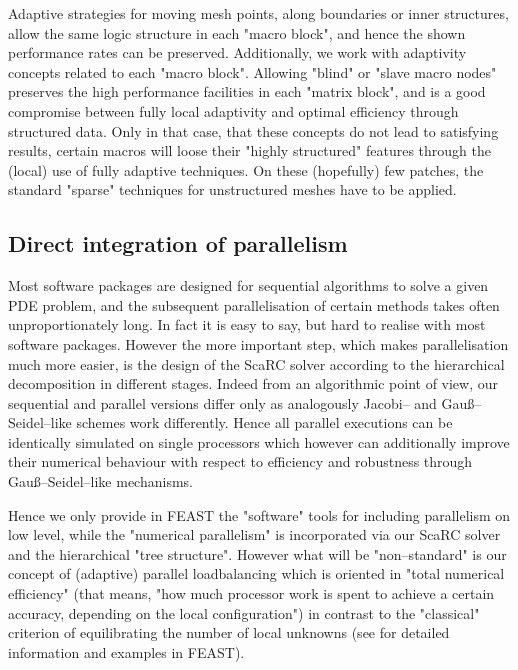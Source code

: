 Adaptive strategies for moving mesh points, along boundaries or inner structures, allow the same 
logic structure in each "macro block", and hence the shown performance rates can be preserved. 
Additionally, we work with adaptivity concepts related to 
each "macro block". Allowing "blind" or "slave macro nodes" preserves the 
high performance facilities in each "matrix block", and is a good compromise between fully local 
adaptivity and optimal efficiency through structured data. Only in that case, that these concepts do not 
lead to satisfying results, certain macros will loose their "highly structured" features through 
the (local) use of fully adaptive techniques. On these (hopefully) few patches, the standard "sparse" 
techniques for unstructured meshes have to be applied.

\subsection{Direct integration of parallelism}

Most software packages are designed for sequential algorithms to solve a given PDE problem, and the 
subsequent parallelisation of certain methods takes often unproportionately long. 
In fact it is easy to say, but hard to realise with most software packages.  However the more important step, which makes parallelisation 
much more easier, is the design of the {\sc ScaRC} solver according to the hierarchical decomposition 
in different stages. Indeed from an algorithmic point of view, our sequential and parallel 
versions differ only as analogously Jacobi-- and Gau{\ss}--Seidel--like schemes work differently. 
Hence all parallel executions can be identically simulated on single processors which however can 
additionally improve their numerical behaviour with respect to efficiency and robustness through 
Gau{\ss}--Seidel--like mechanisms. 

Hence we only provide in {\sc FEAST} the "software" tools for including parallelism on low 
level, while the "numerical parallelism" is incorporated via our {\sc ScaRC} solver and the 
hierarchical "tree structure". However what will be "non--standard" is our concept of (adaptive) 
parallel loadbalancing 
which is oriented in "total numerical efficiency" (that means, "how much processor work is spent to achieve 
a certain accuracy, depending on the local configuration") in contrast to the "classical" criterion of 
equilibrating the number of local unknowns (see \cite{Becker2003} for detailed information and examples in {\sc FEAST}).

